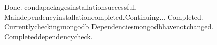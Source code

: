 \documentclass[a4paper,10pt,english]{sphinxmanual}
\begin{document}
\begin{sphinxVerbatim}[commandchars=\\\{\}]
Done.
condapackagesinstallationsuccessful.
\PYGZhy{}\PYGZhy{}\PYGZhy{}\PYGZhy{}\PYGZhy{}\PYGZhy{}\PYGZhy{}\PYGZhy{}\PYGZhy{}\PYGZhy{}\PYGZhy{}\PYGZhy{}\PYGZhy{}\PYGZhy{}\PYGZhy{}\PYGZhy{}\PYGZhy{}\PYGZhy{}\PYGZhy{}\PYGZhy{}\PYGZhy{}\PYGZhy{}\PYGZhy{}\PYGZhy{}\PYGZhy{}\PYGZhy{}\PYGZhy{}\PYGZhy{}\PYGZhy{}\PYGZhy{}\PYGZhy{}\PYGZhy{}\PYGZhy{}\PYGZhy{}\PYGZhy{}\PYGZhy{}\PYGZhy{}\PYGZhy{}\PYGZhy{}\PYGZhy{}\PYGZhy{}\PYGZhy{}\PYGZhy{}\PYGZhy{}\PYGZhy{}\PYGZhy{}\PYGZhy{}\PYGZhy{}\PYGZhy{}\PYGZhy{}\PYGZhy{}\PYGZhy{}\PYGZhy{}\PYGZhy{}\PYGZhy{}\PYGZhy{}\PYGZhy{}\PYGZhy{}\PYGZhy{}\PYGZhy{}\PYGZhy{}\PYGZhy{}\PYGZhy{}\PYGZhy{}\PYGZhy{}\PYGZhy{}\PYGZhy{}\PYGZhy{}\PYGZhy{}\PYGZhy{}\PYGZhy{}\PYGZhy{}
Maindependencyinstallationcompleted.Continuing...
\PYGZhy{}\PYGZhy{}\PYGZhy{}\PYGZhy{}\PYGZhy{}\PYGZhy{}\PYGZhy{}\PYGZhy{}\PYGZhy{}\PYGZhy{}\PYGZhy{}\PYGZhy{}\PYGZhy{}\PYGZhy{}\PYGZhy{}\PYGZhy{}\PYGZhy{}\PYGZhy{}\PYGZhy{}\PYGZhy{}\PYGZhy{}\PYGZhy{}\PYGZhy{}\PYGZhy{}\PYGZhy{}\PYGZhy{}\PYGZhy{}\PYGZhy{}\PYGZhy{}\PYGZhy{}\PYGZhy{}\PYGZhy{}\PYGZhy{}\PYGZhy{}\PYGZhy{}\PYGZhy{}\PYGZhy{}\PYGZhy{}\PYGZhy{}\PYGZhy{}\PYGZhy{}\PYGZhy{}\PYGZhy{}\PYGZhy{}\PYGZhy{}\PYGZhy{}\PYGZhy{}\PYGZhy{}\PYGZhy{}\PYGZhy{}\PYGZhy{}\PYGZhy{}\PYGZhy{}\PYGZhy{}\PYGZhy{}\PYGZhy{}\PYGZhy{}\PYGZhy{}\PYGZhy{}\PYGZhy{}\PYGZhy{}\PYGZhy{}\PYGZhy{}\PYGZhy{}\PYGZhy{}\PYGZhy{}\PYGZhy{}\PYGZhy{}\PYGZhy{}\PYGZhy{}\PYGZhy{}\PYGZhy{}
Completed.
Currentlycheckingmongodb
Dependenciesmongodbhavenotchanged.
Completeddependencycheck.


\end{sphinxVerbatim}
\end{document}
